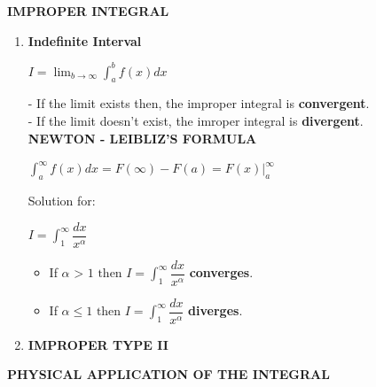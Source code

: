 \documentclass[10pt]{article}
\begin{document}
\pagebreak
\begin{center}
\textbf{IMPROPER INTEGRAL}
\end{center}
\begin{enumerate}
	\item \textbf{Indefinite Interval}\\
	 \begin{mybox}
	 \begin{center}
	 $I = \displaystyle \lim_{b \to \infty} \int_{a}^{b} f(x)dx$
	 \end{center}
	 \end{mybox}
	 - If the limit exists then, the improper integral is \textbf{convergent}.\\
	 - If the limit doesn't exist, the imroper integral is \textbf{divergent}.\\
	 \textbf{NEWTON - LEIBLIZ'S FORMULA}\\
	 \begin{mybox}
	 \begin{center}
	 $ \displaystyle \int_{a}^{\infty} f(x)dx = F(\infty) - F(a) = F(x)|_a^{\infty}$
	 \end{center}
	 \end{mybox}
	 Solution for:
	 \begin{center}
	 $I = \displaystyle \int_{1}^{\infty} \dfrac{dx}{x^{\alpha}}$
	 \end{center}
	 \begin{itemize}
	 \item If $\alpha \mbox{ > 1 then } I = \displaystyle \int_{1}^{\infty} \dfrac{dx}{x^{\alpha}}$ \textbf{converges}.
	 \item If $\alpha \le 1 \mbox{ then } I = \displaystyle \int_{1}^{\infty} \dfrac{dx}{x^{\alpha}}$ \textbf{diverges}.
	 \end{itemize}
	 \item \textbf{IMPROPER TYPE II}\\
\end{enumerate}
\pagebreak
\begin{center}
\textbf{PHYSICAL APPLICATION OF THE INTEGRAL}
\end{center}
\end{document}
